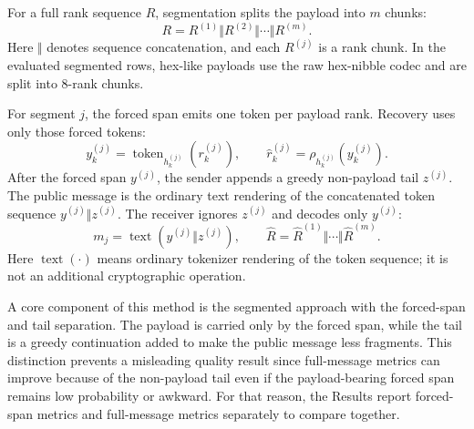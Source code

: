 \documentclass[fleqn,10pt]{wlscirep}
\begin{document}
For a full rank sequence \(R\), segmentation splits the payload into \(m\) chunks:
\begin{equation}
R = R^{(1)}\Vert R^{(2)}\Vert \cdots \Vert R^{(m)}.
\label{eq:rank-segmentation}
\end{equation}
Here \(\Vert\) denotes sequence concatenation, and each \(R^{(j)}\) is a rank chunk. In the evaluated segmented rows, hex-like payloads use the raw hex-nibble codec and are split into 8-rank chunks.

For segment \(j\), the forced span emits one token per payload rank. Recovery uses only those forced tokens:
\begin{equation}
y^{(j)}_k=
\operatorname{token}_{h^{(j)}_k}\left(r^{(j)}_k\right),
\qquad
\hat r^{(j)}_k=
\rho_{h^{(j)}_k}\left(y^{(j)}_k\right).
\label{eq:segmented-forced-span}
\end{equation}
After the forced span \(y^{(j)}\), the sender appends a greedy non-payload tail \(z^{(j)}\). The public message is the ordinary text rendering of the concatenated token sequence \(y^{(j)}\Vert z^{(j)}\). The receiver ignores \(z^{(j)}\) and decodes only \(y^{(j)}\):
\begin{equation}
m_j=\operatorname{text}\left(y^{(j)}\Vert z^{(j)}\right),
\qquad
\hat R=\hat R^{(1)}\Vert\cdots\Vert\hat R^{(m)}.
\label{eq:segmented-message}
\end{equation}
Here \(\operatorname{text}(\cdot)\) means ordinary tokenizer rendering of the token sequence; it is not an additional cryptographic operation.

A core component of this method is the segmented approach with the forced-span and tail separation. The payload is carried only by the forced span, while the tail is a greedy continuation added to make the public message less fragments. This distinction prevents a misleading quality result since full-message metrics can improve because of the non-payload tail even if the payload-bearing forced span remains low probability or awkward. For that reason, the Results report forced-span metrics and full-message metrics separately to compare together.
\end{document}
